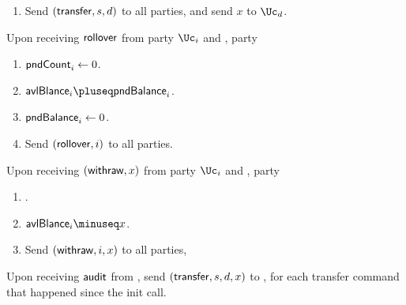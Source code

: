 \begin{functionality}
\begin{description}
\begin{enumerate}
		
		\item Send $(\mathsf{transfer},s,d)$ to all parties, and send $x$ to $\Uc_d$.
			
		\end{enumerate}
		
		\item[Rollover.]     Upon receiving $\mathsf{rollover}$ from  party $\Uc_i$ and \Cc,  party \Cc
		
		\begin{enumerate}
			
			
			\item $\mathsf{pndCount}_i \leftarrow 0$.
			
			
			\item  $\balance_i  \pluseq \pendbalance_i$.
			
			\item  $\mathsf{pndBalance}_i  \leftarrow 0$.
			
			
			
			\item  Send $ (\mathsf{rollover},i)$ to all parties.
		\end{enumerate}

		
			\item[Withraw.]     Upon receiving $(\mathsf{withraw},x)$ from  party $\Uc_i$ and \Cc,  party \Cc
		
		\begin{enumerate}
			
			
			 \item \Assert{$ \balance_i  \ge x$}.
			
			\item $\balance_i \minuseq x$.
			
			
			
			\item Send $(\mathsf{withraw},i,x)$ to all parties,
			
		\end{enumerate}
		
		
		
		\item[Audit.]     Upon receiving $\mathsf{audit}$ from  \Auditor, send $(\mathsf{transfer},s,d,x)$ to \Auditor, for each transfer command that happened since  the init call.
		
	\end{description}

\end{functionality}


